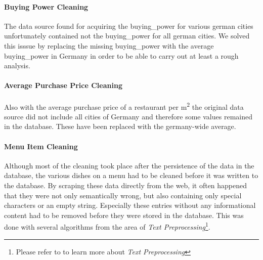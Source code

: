 \paragraph{Buying Power Cleaning}
The data source found for acquiring the buying\_power for various german cities unfortunately contained not the buying\_power for all german cities.
We solved this isssue by replacing the missing buying\_power with the average buying\_power in Germany in order to be able to carry out at least a rough analysis.
\paragraph{Average Purchase Price Cleaning}
Also with the average purchase price of a restaurant per m\textsuperscript{2} the original data source did not include all cities of Germany and therefore
some  values remained in the database.
These have been replaced with the germany-wide average.
\paragraph{Menu Item Cleaning}
Although most of the cleaning took place after the persistence of the data in the database, the various dishes on a menu had to be
cleaned before it was written to the database.
By scraping these data directly from the web, it often happened that they were not only semantically wrong, but also containing only
special characters or an empty string.
Especially these entries without any informational content had to be removed before they were stored in the database.
This was done with several algorithms from the area of \textit{Text Preprocessing}\footnote{Please refer to  to learn more about \textit{Text Preprocessing}}.
